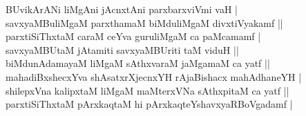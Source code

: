 \begin{entry}
\medskip
\begin{shl}
BUvikArANi liMgAni jAcnxtAni parxbarxviVmi vaH |\\[2pt]
savxyaMBuliMgaM parxthamaM biMduliMgaM divxtiVyakamf ||\\[2pt]
parxtiSiThxtaM caraM ceYva guruliMgaM ca paMcamamf |\\[2pt]
savxyaMBUtaM jAtamiti savxyaMBUriti taM viduH ||\\[2pt]
biMdunAdamayaM liMgaM sAthxvaraM jaMgamaM ca yatf ||\\[2pt]
mahadiBxshecxYva shAsatxrXjecnxYH rAjaBishacx mahAdhaneYH |\\[2pt]
shilepxVna kalipxtaM liMgaM maMterxVNa sAthxpitaM ca yatf ||\\[2pt]
parxtiSiThxtaM pArxkaqtaM hi pArxkaqteYshavxyaRBoVgadamf |
\end{shl}


\end{entry}
